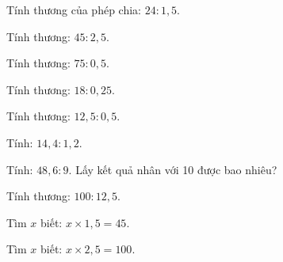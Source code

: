 
\begin{ex}
  Tính thương của phép chia: $24 : 1{,}5$.
\end{ex}

\begin{ex}
  Tính thương: $45 : 2{,}5$.
\end{ex}

\begin{ex}
  Tính thương: $75 : 0{,}5$.
\end{ex}

\begin{ex}
  Tính thương: $18 : 0{,}25$.
\end{ex}

\begin{ex}
  Tính thương: $12{,}5 : 0{,}5$.
\end{ex}

\begin{ex}
  Tính: $14{,}4 : 1{,}2$.
\end{ex}

\begin{ex}
  Tính: $48{,}6 : 9$. Lấy kết quả nhân với 10 được bao nhiêu?
\end{ex}

\begin{ex}
  Tính thương: $100 : 12{,}5$.
\end{ex}

\begin{ex}
  Tìm $x$ biết: $x \times 1{,}5 = 45$.
\end{ex}

\begin{ex}
  Tìm $x$ biết: $x \times 2{,}5 = 100$.
\end{ex}

